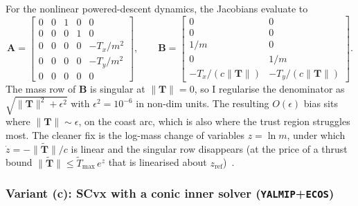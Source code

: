 \documentclass[../main.tex]{subfiles}
\begin{document}
For the nonlinear powered-descent dynamics, the Jacobians evaluate to
\begin{equation}
    \mathbf{A} = \begin{bmatrix}
        0 & 0 & 1 & 0 & 0 \\
        0 & 0 & 0 & 1 & 0 \\
        0 & 0 & 0 & 0 & -T_x/m^2 \\
        0 & 0 & 0 & 0 & -T_y/m^2 \\
        0 & 0 & 0 & 0 & 0
    \end{bmatrix},\qquad
    \mathbf{B} = \begin{bmatrix}
        0 & 0 \\
        0 & 0 \\
        1/m & 0 \\
        0 & 1/m \\
        -T_x/(c\|\mathbf{T}\|) & -T_y/(c\|\mathbf{T}\|)
    \end{bmatrix}.
\end{equation}
The mass row of $\mathbf{B}$ is singular at $\|\mathbf{T}\| = 0$, so I regularise the denominator as $\sqrt{\|\mathbf{T}\|^2 + \epsilon^2}$ with $\epsilon^2 = 10^{-6}$ in non-dim units. The resulting $O(\epsilon)$ bias sits where $\|\mathbf{T}\| \sim \epsilon$, on the coast arc, which is also where the trust region struggles most. The cleaner fix is the log-mass change of variables $z = \ln m$, under which $\dot{z} = -\|\tilde{\mathbf{T}}\|/c$ is linear and the singular row disappears (at the price of a thrust bound $\|\tilde{\mathbf{T}}\| \leq \tilde{T}_{\max}\,e^{z}$ that is linearised about $z_{\mathrm{ref}}$)~\cite[Sec.~3.8.3]{benedikter2022}.

\subsubsection*{Variant (c): SCvx with a conic inner solver (\texttt{YALMIP}+\texttt{ECOS})}\label{sec:scvx_yalmip}
\end{document}

